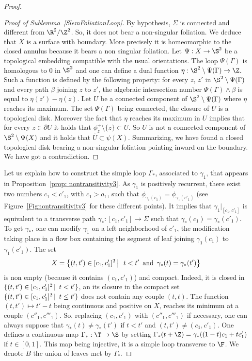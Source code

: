 \begin{proof}
\begin{proof}[Proof of Sublemma~\ref{SlemFoliationLoop}]
By hypothesis, $\Sigma$ is connected and different from $\R^2/\Z^2$. So, it does not bear a non-singular foliation. We deduce that $X$ is a surface with boundary. More precisely it is homeomorphic to the closed annulus because it bears a non singular foliation. Let $\Psi: X\to\S^2$ be a topological embedding compatible with the usual orientations. The loop $\Psi(\Gamma)$ is homologous to $0$ in $\S^2$ and one can define a dual function $\eta:\S^2\setminus\Psi(\Gamma)\to\Z$. Such a function is defined by the following property: for every $z$, $z'$ in $\S^2\setminus\Psi(\Gamma)$ and every path $\beta$ joining $z$ to $z'$, the algebraic intersection number $\Psi(\Gamma)\wedge \beta$ is equal to $\eta(z')-\eta(z)$. Let $U$ be a connected component of $\S^2\setminus\Psi(\Gamma)$ where $\eta$ reaches its maximum. The set $\Psi(\Gamma)$ being connected, the closure of $U$ is a topological disk. Moreover the fact that $\eta$ reaches its maximum in $U$ implies that for every $z\in \partial U$ it holds that $\phi_z^+\setminus\{z\}\subset U$. So $U$ is not a connected component of $\S^2\setminus \Psi(X)$ and it holds that $\overline U\subset \psi(X)$. Summarizing, we have found a closed topological disk bearing a non-singular foliation pointing inward on the boundary. We have got a contradiction.
\end{proof}



Let us explain how to construct the simple loop $\Gamma_*$, associated to $\gamma_1$, that appears in Proposition~\ref{prop: nontransitivity3}. As $\gamma_1$ is positively recurrent, there exist two numbers $c_1<c'_1$, with $c_1>a_1$, such that $\phi_{\gamma_1(c_1)} = \phi_{\gamma_1(c'_1)}$ (see Figure~\ref{Fignontransitivity3} for these different points). It implies that $\gamma_1\vert_{[c_1,c'_1]}$ is equivalent to a transverse path $\gamma_* :[c_1,c'_1]\to\Sigma $ such that $\gamma_*(c_1) = \gamma_*(c'_1)$. To get $\gamma_*$, one can modify $\gamma_1$ on a left neighborhood of $c'_1$, the modification taking place in a flow box containing the segment of leaf joining $\gamma_1(c_1)$ to $\gamma_1(c'_1)$. The set
\[
X=\big\{(t,t')\in [c_1,c'_1]^2\,\big\vert\, \enskip t<t'\enskip\text{and}\enskip \gamma_*(t) = \gamma_*(t')\big\}
\]
is non empty (because it contains $(c_1,c'_1)$) and compact. Indeed, it is closed in $\{(t,t')\in [c_1,c'_1]^2\,\vert \enskip t<t'\}$, an its closure in the compact set $\{(t,t')\in [c_1,c'_1]^2\,\vert \enskip t\leq t'\}$ does not contain any couple $(t,t)$. The function $(t,t')\mapsto t'-t$ being continuous and positive on $X$, reaches its minimum at a couple $(c''_1,c'''_1)$. So, replacing $(c_1,c'_1)$ with $(c''_1, c'''_1)$ if necessary, one can always suppose that $\gamma_*(t)\not=\gamma_*(t')$ if $t<t'$ and $(t,t')\not=(c_1,c'_1)$. One defines a continuous map $\Gamma_*:\T\to\S$ by setting $\Gamma_*(t+\Z)=\gamma_*((1-t)c_1+tc'_1)$ if $t\in[0,1]$. This map being injective, it is a simple loop transverse to $\F$. We denote $B$ the union of leaves met by $\Gamma_*$.


\end{proof}
